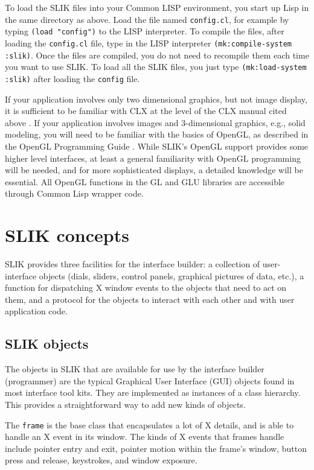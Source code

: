 \documentclass[twoside,openright,11pt]{report}
\newcommand{\tp}[1]{\texttt{#1}}
\begin{document}
To load the SLIK files into your Common LISP environment, you start up
Lisp in the same directory as above.  Load the file named
\tp{config.cl}, for example by typing \tp{(load~"config")} to the LISP
interpreter.  To compile the files, after loading the \tp{config.cl}
file, type in the LISP interpreter \tp{(mk:compile-system :slik)}.
Once the files are compiled, you do not need to recompile them each
time you want to use SLIK.  To load all the SLIK files, you just type
\tp{(mk:load-system :slik)} after loading the \tp{config} file.

If your application involves only two dimensional graphics, but not
image display, it is sufficient to be familiar with CLX at the level
of the CLX manual cited above \cite{scheifler89}.  If your
application involves images and 3-dimensional graphics, e.g., solid
modeling, you will need to be familiar with the basics of OpenGL, as
described in the OpenGL Programming Guide \cite{opengl99}.  While
SLIK's OpenGL support provides some higher level interfaces, at least
a general familiarity with OpenGL programming will be needed, and for
more sophisticated displays, a detailed knowledge will be essential.
All OpenGL functions in the GL and GLU libraries are accessible
through Common Lisp wrapper code.

\chapter{SLIK concepts}

SLIK provides three facilities for the interface builder: a collection
of user-interface objects (dials, sliders, control panels, graphical
pictures of data, etc.), a function for dispatching X window events to
the objects that need to act on them, and a protocol for the objects
to interact with each other and with user application code.

\section{SLIK objects}

The objects in SLIK that are available for use by the interface
builder (programmer) are the typical Graphical User Interface (GUI)
objects found in most interface tool kits.  They are implemented as
instances of a class hierarchy.  This provides a straightforward way
to add new kinds of objects.

The \tp{frame} is the base class that encapsulates a lot of X details,
and is able to handle an X event in its window.  The kinds of X events
that frames handle include pointer entry and exit, pointer motion
within the frame's window, button press and release, keystrokes, and
window exposure.
\end{document}
